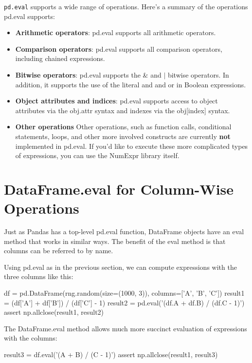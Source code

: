 \verb|pd.eval| supports a wide range of operations. Here's a summary of the operations pd.eval supports:
\begin{itemize}
    \item \textbf{Arithmetic operators}: pd.eval supports all arithmetic operators.
    \item \textbf{Comparison operators}: pd.eval supports all comparison operators, including chained expressions.
    \item \textbf{Bitwise operators}: pd.eval supports the \& and $|$ bitwise operators. In addition, it supports the use of the literal and and or in Boolean expressions.
    \item \textbf{Object attributes and indices}: pd.eval supports access to object attributes via the obj.attr syntax and indexes via the obj[index] syntax.
    \item \textbf{Other operations}
          Other operations, such as function calls, conditional statements, loops, and other
          more involved constructs are currently \textbf{not} implemented in pd.eval. If you'd like
          to execute these more complicated types of expressions, you can use the
          NumExpr library itself.
\end{itemize}

\section{DataFrame.eval for Column-Wise Operations}
Just as Pandas has a top-level pd.eval function, DataFrame objects have an eval
method that works in similar ways. The benefit of the eval method is that columns
can be referred to by name.

Using pd.eval as in the previous section, we can compute expressions with the three
columns like this:

\begin{pyc}
    df = pd.DataFrame(rng.random(size=(1000, 3)), columns=['A', 'B', 'C'])
    result1 = (df['A'] + df['B']) / (df['C'] - 1)
    result2 = pd.eval('(df.A + df.B) / (df.C - 1)')
    assert np.allclose(result1, result2)
\end{pyc}

The DataFrame.eval method allows much more succinct evaluation of expressions
with the columns:

\begin{pyc}
    result3 = df.eval('(A + B) / (C - 1)')
    assert np.allclose(result1, result3)
\end{pyc}

